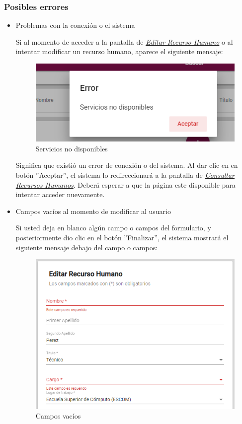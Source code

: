                \subsubsection{Posibles errores}
                    \begin{itemize}
                        \item Problemas con la conexión o el sistema

                            Si al momento de acceder a la pantalla de \hyperlink{editarRH}{\textit{Editar Recurso Humano}} o al intentar modificar un recurso humano, aparece el siguiente mensaje:
                            \clearpage
                            \begin{figure}[H]
                                \centering
                                \includegraphics[width=0.4\linewidth]{images/SP1/MSGSN}
                                \caption{Servicios no disponibles}

                            \end{figure}


                            Significa que existió un error de conexión o del sistema. Al dar clic en en botón ''Aceptar'', el sistema lo redireccionará  a la pantalla de \hyperlink{consultarRH}{\textit{Consultar Recursos Humanos}}. Deberá esperar a que la página este disponible para intentar acceder nuevamente.

                        \item Campos vacíos al momento de modificar al usuario

                            Si usted deja en blanco algún campo o campos del formulario, y posteriormente dio clic en el botón ''Finalizar'', el sistema mostrará el siguiente mensaje debajo del campo o campos:

                          \begin{figure}[H]
                            \centering
                            \includegraphics[width=0.4\linewidth]{images/SP1/MSG44-1}
                            \caption{Campos vacíos}
                            \label{mensaje44}


\end{figure}
\end{itemize}
